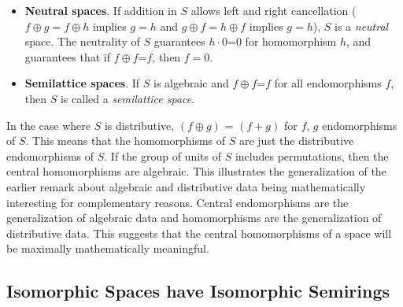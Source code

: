 \documentclass[11pt]{article}
\begin{document}
\begin{itemize}
\item{{\bf Neutral spaces}. If addition in $S$ allows left and right cancellation ($f\oplus g=f\oplus h$ implies $g=h$ and $g\oplus f=h\oplus f$ implies $g=h$), 
$S$ is a {\it neutral} space.  The neutrality of $S$ guarantees $h\cdot 0$=0 for homomorphism $h$, and guarantees that if $f\oplus f$=$f$, then $f=0$.} 

\item{{\bf Semilattice spaces}.  If $S$ is algebraic and $f\oplus f$=$f$ for all endomorphisms $f$, then $S$ is called a {\it semilattice space}.}

\end{itemize} 
In the case where $S$ is distributive, $(f\oplus g)$ = $(f+g)$ for $f$, $g$ endomorphisms of $S$.  This means that the homomorphisms of $S$ are 
just the distributive endomorphisms of $S$.  If the group of units of $S$ includes permutations, then the central homomorphisms are algebraic.  This illustrates 
the generalization of the earlier remark about algebraic and distributive data being mathematically interesting for complementary reasons.  Central 
endomorphisms are the generalization of algebraic data and homomorphisms are the generalization of distributive data.  
This suggests that the central homomorphisms of a space will be maximally mathematically meaningful.

\subsection{Isomorphic Spaces have Isomorphic Semirings} 
\end{document}
